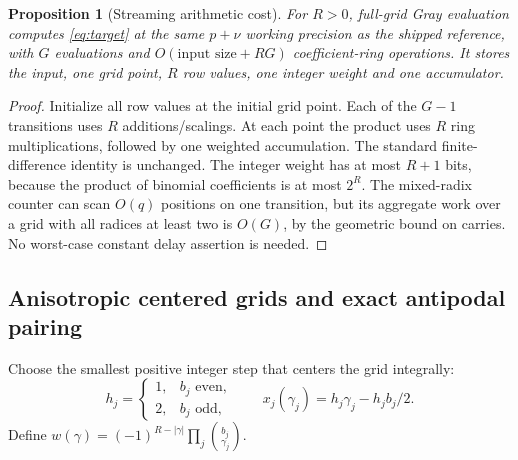 \documentclass[11pt,letterpaper]{article}
\newtheorem{proposition}[theorem]{Proposition}
\theoremstyle{definition}\newtheorem{definition}[theorem]{Definition}
\theoremstyle{remark}\newtheorem{remark}[theorem]{Remark}
\begin{document}
\begin{proposition}[Streaming arithmetic cost]\label{prop:gray}
For $R>0$, full-grid Gray evaluation computes \eqref{eq:target} at the same
$p+\nu$ working precision as the shipped reference, with $G$ evaluations
and $O(\text{input size}+RG)$ coefficient-ring operations. It stores the
input, one grid point, $R$ row values, one integer weight and one accumulator.
\end{proposition}
\begin{proof}
Initialize all row values at the initial grid point. Each of the $G-1$
transitions uses $R$ additions/scalings. At each point the product uses
$R$ ring multiplications, followed by one weighted accumulation. The
standard finite-difference identity is unchanged. The integer weight has
at most $R+1$ bits, because the product of binomial coefficients is at
most $2^R$. The mixed-radix counter can scan $O(q)$ positions on one
transition, but its aggregate work over a grid with all radices at least
two is $O(G)$, by the geometric bound on carries. No worst-case constant
delay assertion is needed.
\end{proof}

\subsection{Anisotropic centered grids and exact antipodal pairing}
Choose the smallest positive integer step that centers the grid integrally:
\begin{equation}\label{eq:steps}
 h_j=\begin{cases}1,&b_j\text{ even},\\2,&b_j\text{ odd},\end{cases}
 \qquad x_j(\gamma_j)=h_j\gamma_j-h_jb_j/2.
\end{equation}
Define $w(\gamma)=(-1)^{R-|\gamma|}\prod_j\binom{b_j}{\gamma_j}$.
\end{document}

